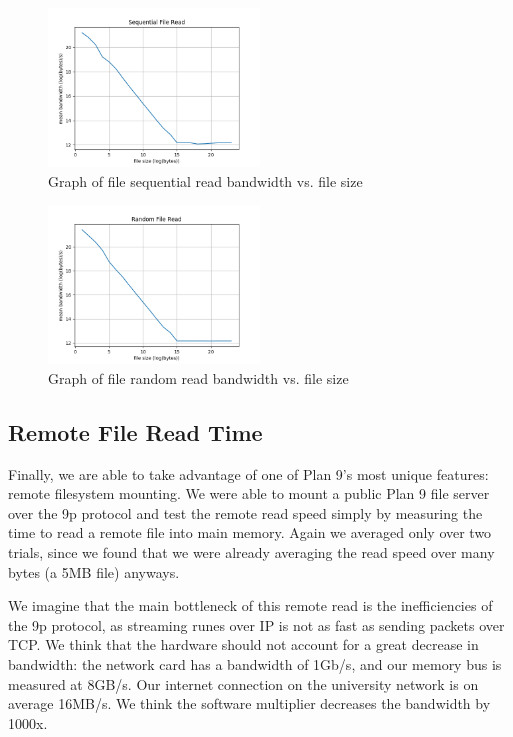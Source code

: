 \documentclass[letterpaper,twocolumn,10pt]{article}
\begin{document}
\begin{figure}
	\centering
    \includegraphics[width=0.5\textwidth]{graphs/file_read_seq}
  \caption{Graph of file sequential read bandwidth vs. file size}
	\label{fig:filecache}
\end{figure}

\begin{figure}
	\centering
    \includegraphics[width=0.5\textwidth]{graphs/file_read_rand}
  \caption{Graph of file random read bandwidth vs. file size}
	\label{fig:filecache}
\end{figure}

\subsection{Remote File Read Time}
Finally, we are able to take advantage of one of Plan 9's most unique features:
remote filesystem mounting. We were able to mount a public Plan 9 file server
over the 9p protocol and test the remote read speed simply by measuring the
time to read a remote file into main memory. Again we averaged only over two
trials, since we found that we were already averaging the read speed over many
bytes (a 5MB file) anyways.

We imagine that the main bottleneck of this remote read is the inefficiencies
of the 9p protocol, as streaming runes over IP is not as fast as sending packets
over TCP. We think that the hardware should not account for a great decrease
in bandwidth: the network card has a bandwidth of 1Gb/s, and our memory bus
is measured at 8GB/s. Our internet connection on the university network is
on average 16MB/s. We think the software multiplier decreases
the bandwidth by 1000x.
\end{document}
